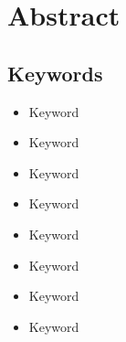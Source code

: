 \chapter*{Abstract}\label{ch:abstract-en}

\lipsum[1-3]

\section*{Keywords}\label{sec:keywords-en}
\begin{multicols}{2}
    \begin{itemize}
        \item Keyword
        \item Keyword
        \item Keyword
        \item Keyword
    \end{itemize}
    \columnbreak
    \begin{itemize}
        \item Keyword
        \item Keyword
        \item Keyword
        \item Keyword
    \end{itemize}
\end{multicols}